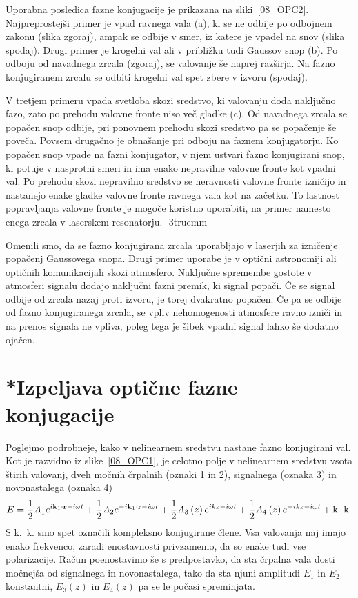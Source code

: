 Uporabna posledica fazne konjugacije je prikazana na sliki~\ref{08_OPC2}.
Najpreprostejši primer je vpad ravnega vala (a), ki se ne odbije po 
odbojnem zakonu (slika zgoraj), ampak se odbije v smer, iz katere 
je vpadel na snov (slika spodaj). Drugi primer je krogelni val 
ali v približku tudi Gaussov snop (b). Po odboju od navadnega zrcala (zgoraj), se 
valovanje še naprej razširja. Na fazno konjugiranem zrcalu se odbiti krogelni val spet
zbere v izvoru (spodaj). 

V tretjem primeru vpada svetloba skozi sredstvo, ki valovanju doda naključno
fazo, zato po prehodu valovne fronte niso več gladke (c). Od navadnega zrcala
se popačen snop odbije, pri ponovnem prehodu skozi sredstvo pa se popačenje
še poveča. Povsem drugačno je obnašanje pri odboju na faznem konjugatorju. 
Ko popačen snop vpade na fazni konjugator, v njem ustvari fazno konjugirani snop, 
ki potuje v nasprotni smeri in ima enako nepravilne valovne fronte kot vpadni val. Po prehodu
skozi nepravilno sredstvo se neravnosti valovne fronte izničijo
in nastanejo enake gladke valovne fronte ravnega vala kot na začetku. 
To lastnost popravljanja valovne fronte je mogoče 
koristno uporabiti, na primer namesto enega zrcala v laserskem resonatorju.
\vglue-3truemm
\begin{remark}
Omenili smo, da se fazno konjugirana zrcala uporabljajo v laserjih za izničenje
popačenj Gaussovega snopa. Drugi primer uporabe je v optični astronomiji
ali optičnih komunikacijah skozi atmosfero. Naključne spremembe gostote v atmosferi
signalu dodajo naključni fazni premik, ki signal popači. Če se signal odbije od zrcala nazaj
proti izvoru, je torej dvakratno popačen. Če pa se odbije od fazno konjugiranega zrcala, 
se vpliv nehomogenosti atmosfere ravno izniči in na prenos signala ne vpliva, poleg
tega je šibek vpadni signal lahko še dodatno ojačen. 
\end{remark}

\section{*Izpeljava optične fazne konjugacije}
Poglejmo podrobneje, kako v nelinearnem sredstvu nastane fazno konjugirani
val. Kot je razvidno iz slike~\ref{08_OPC1}, je celotno polje v nelinearnem
sredstvu vsota štirih valovanj, dveh močnih črpalnih (oznaki 1 in 2), signalnega 
(oznaka 3) in novonastalega (oznaka 4)
\begin{equation}
E=\frac{1}{2}A_{1}e^{i{\bf k}_{1}\cdot{\bf r}-i\omega t}+\frac{1}{2}A_{2}e^{-i{\bf k}_{1}\cdot{\bf r}-
i\omega t}+\frac{1}{2}A_{3}\left(z\right)e^{ikz-i\omega t}+\frac{1}{2}A_{4}
\left(z\right)e^{-ikz-i\omega t}+\mathrm{k.~k.}
\label{8.99}
\end{equation}
S k.~k. smo spet označili kompleksno konjugirane člene.  Vsa valovanja naj imajo
enako frekvenco, zaradi enostavnosti privzamemo, da so enake tudi vse polarizacije.
Račun poenostavimo še s predpostavko, da sta črpalna vala dosti močnejša 
od signalnega in novonastalega, tako da sta njuni
amplitudi $E_{1}$ in $E_{2}$ konstantni, $E_{3}\left(z\right)$ in $E_{4}\left(z\right)$
pa se le počasi spreminjata.

